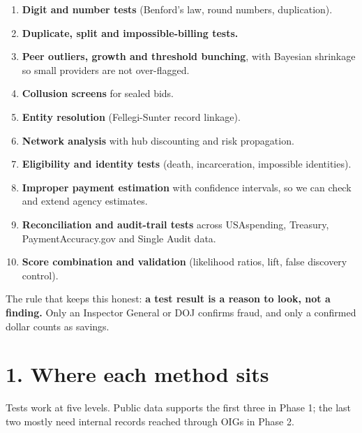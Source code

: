 \documentclass[letterpaper,11pt]{article}
\providecommand{\tightlist}{\setlength{\itemsep}{0pt}\setlength{\parskip}{0pt}}
\begin{document}
\begin{enumerate}
\def\labelenumi{\arabic{enumi}.}
\tightlist
\item
  \textbf{Digit and number tests} (Benford's law, round numbers,
  duplication).
\item
  \textbf{Duplicate, split and impossible-billing tests.}
\item
  \textbf{Peer outliers, growth and threshold bunching}, with Bayesian
  shrinkage so small providers are not over-flagged.
\item
  \textbf{Collusion screens} for sealed bids.
\item
  \textbf{Entity resolution} (Fellegi-Sunter record linkage).
\item
  \textbf{Network analysis} with hub discounting and risk propagation.
\item
  \textbf{Eligibility and identity tests} (death, incarceration,
  impossible identities).
\item
  \textbf{Improper payment estimation} with confidence intervals, so we
  can check and extend agency estimates.
\item
  \textbf{Reconciliation and audit-trail tests} across USAspending,
  Treasury, PaymentAccuracy.gov and Single Audit data.
\item
  \textbf{Score combination and validation} (likelihood ratios, lift,
  false discovery control).
\end{enumerate}

The rule that keeps this honest: \textbf{a test result is a reason to
look, not a finding.} Only an Inspector General or DOJ confirms fraud,
and only a confirmed dollar counts as savings.

\hypertarget{where-each-method-sits}{%
\section*{1. Where each method sits}\label{where-each-method-sits}}

Tests work at five levels. Public data supports the first three in Phase
1; the last two mostly need internal records reached through OIGs in
Phase 2.
\end{document}
